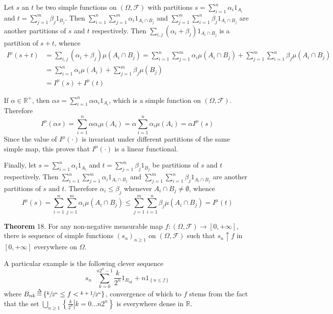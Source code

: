 \documentclass[a4paper]{article}
\newcommand{\obj}[1]{\left\{ #1 \right \}}
\newcommand{\clo}[1]{\left [ #1 \right ]}
\newcommand{\brac}[1]{\left ( #1 \right )}
\newcommand{\induc}[1]{\left . #1 \right \vert}
\newcommand{\Real}{\mathbb{R}}
\newcommand{\Zinf}{\clo{ 0, +\infty }}
\newcommand{\Fcal}{\mathcal{F}}
\newcommand{\defn}{\mathop{\overset{\Delta}{=}}\nolimits}
\begin{document}
Let $s$ an $t$ be two simple functions on $\brac{\Omega, \Fcal}$ with partitions $s=\sum_{i=1}^n \alpha_i 1_{A_i}$ and $t=\sum_{j=1}^m \beta_j 1_{B_j}$. Then $\sum_{i=1}^n \sum_{j=1}^m \alpha_i 1_{A_i\cap B_j}$ and $\sum_{j=1}^m \sum_{i=1}^n \beta_j 1_{A_i\cap B_j}$ are another partitions of $s$ and $t$ respectively. Then $\sum_{i,j} \brac{\alpha_i+\beta_j} 1_{A_i\cap B_j}$ is a partition of $s+t$, whence \begin{align*}I^\mu\brac{s+t} &= \sum_{i,j} \brac{\alpha_i+\beta_j} \mu\brac{A_i\cap B_j} = \sum_{i=1}^n \sum_{j=1}^m \alpha_i \mu\brac{A_i\cap B_j} + \sum_{j=1}^m \sum_{i=1}^n \beta_j \mu\brac{A_i\cap B_j} \\&= \sum_{i=1}^n \alpha_i \mu\brac{A_i} + \sum_{j=1}^m \beta_j \mu\brac{B_j} \\&= I^\mu\brac{s} + I^\mu\brac{t}\end{align*}

If $\alpha\in \Real^+$, then $\alpha s = \sum_{i=1}^n \alpha \alpha_i 1_{A_i}$, which is a simple function on $\brac{\Omega, \Fcal}$. Therefore \[I^\mu\brac{\alpha s} = \sum_{i=1}^n \alpha \alpha_i \mu\brac{A_i} = \alpha \sum_{i=1}^n \alpha_i \mu\brac{A_i} = \alpha I^\mu\brac{s}\]  Since the value of $I^\mu\brac{\cdot}$ is invariant under different partitions of the same simple map, this proves that $I^\mu\brac{\cdot}$ is a linear functional.

Finally, let $s=\sum_{i=1}^n \alpha_i 1_{A_i}$ and $t=\sum_{j=1}^m \beta_j 1_{B_j}$ be partitions of $s$ and $t$ respectively. Then $\sum_{i=1}^n \sum_{j=1}^m \alpha_i 1_{A_i\cap B_j}$ and $\sum_{j=1}^m \sum_{i=1}^n \beta_j 1_{A_i\cap B_j}$ are another partitions of $s$ and $t$. Therefore $\alpha_i\leq \beta_j$ whenever $A_i\cap B_j\neq \emptyset$, whence \[I^\mu\brac{s} = \sum_{i=1}^n \sum_{j=1}^m \alpha_i \mu\brac{A_i\cap B_j}\leq \sum_{j=1}^m \sum_{i=1}^n \beta_j \mu\brac{A_i\cap B_j} = I^\mu\brac{t}\]

\label{thm:simp_seq} \noindent \textbf{Theorem} 18.
For any non-negative measurable map $f:\brac{\Omega, \Fcal}\to\Zinf$, there is sequence of simple functions $\brac{s_n}_{n\geq 1}$ on $\brac{\Omega, \Fcal}$ such that $s_n\uparrow f$ in $\Zinf$ everywhere on $\Omega$.

A particular example is the following clever sequence \[s_n \defn \sum_{k=0}^{n 2^n - 1} \frac{k}{2^n} 1_{B_{nk}} + n 1_{\obj{n\leq f}} \] where $B_{nk} \defn \obj{ \sfrac{k}{2^n} \leq f < \sfrac{k+1}{2^n}}$, convergence of which to $f$ stems from the fact that the set $\bigcup_{n\geq 1} \obj{\induc{\frac{k}{2^n}} k = 0\ldots n 2^n}$ is everywhere dense in $\Real$.\\
\end{document}
